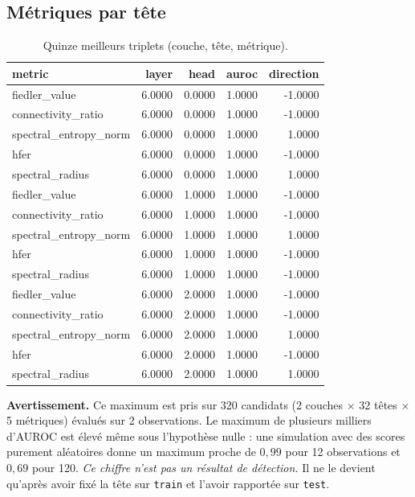 \documentclass[11pt,a4paper]{article}
\begin{document}
\subsection{Métriques par tête}

\begin{table}[htbp]
\centering
\small
\begin{tabular}{lrrrr}
\hline
metric & layer & head & auroc & direction \\
\hline
fiedler\_value & 6.0000 & 0.0000 & 1.0000 & -1.0000 \\
connectivity\_ratio & 6.0000 & 0.0000 & 1.0000 & -1.0000 \\
spectral\_entropy\_norm & 6.0000 & 0.0000 & 1.0000 & 1.0000 \\
hfer & 6.0000 & 0.0000 & 1.0000 & -1.0000 \\
spectral\_radius & 6.0000 & 0.0000 & 1.0000 & 1.0000 \\
fiedler\_value & 6.0000 & 1.0000 & 1.0000 & -1.0000 \\
connectivity\_ratio & 6.0000 & 1.0000 & 1.0000 & -1.0000 \\
spectral\_entropy\_norm & 6.0000 & 1.0000 & 1.0000 & 1.0000 \\
hfer & 6.0000 & 1.0000 & 1.0000 & -1.0000 \\
spectral\_radius & 6.0000 & 1.0000 & 1.0000 & -1.0000 \\
fiedler\_value & 6.0000 & 2.0000 & 1.0000 & -1.0000 \\
connectivity\_ratio & 6.0000 & 2.0000 & 1.0000 & -1.0000 \\
spectral\_entropy\_norm & 6.0000 & 2.0000 & 1.0000 & 1.0000 \\
hfer & 6.0000 & 2.0000 & 1.0000 & -1.0000 \\
spectral\_radius & 6.0000 & 2.0000 & 1.0000 & 1.0000 \\
\hline
\end{tabular}
\caption{Quinze meilleurs triplets (couche, tête, métrique).}
\label{tab:heads}
\end{table}


\textbf{Avertissement.} Ce maximum est pris sur 320 candidats
(2 couches $\times$ 32 têtes
$\times$ 5 métriques) évalués sur 2
observations. Le maximum de plusieurs milliers d'AUROC est élevé même sous
l'hypothèse nulle : une simulation avec des scores purement aléatoires donne
un maximum proche de $0{,}99$ pour 12 observations et $0{,}69$ pour 120.
\emph{Ce chiffre n'est pas un résultat de détection.} Il ne le devient
qu'après avoir fixé la tête sur \texttt{train} et l'avoir rapportée sur
\texttt{test}.
\end{document}
